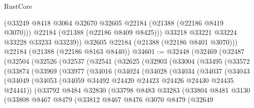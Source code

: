 \begin{lexlean}{RustCore}
\begin{coremodule}
            (@33249 @8418 @3064 @32670 @32605 @22184 (@21388 (@22186 @8419 @3070)))
            @22184
            (@21388 (@22186 @8409 @8425)))
          @33218
          @33221
          @33224
          @33228
          @33233
          @33239))
      @32605
      @22184
      (@21388 (@22186 @8401 @3070)))
    @22184
    (@21388 (@22186 @8163 @8440))
@34601 := @32448
    (@32469
      (@32487
        (@32504
          (@32526
            (@32537
              (@32541
                (@32625
                  (@32903
                    (@33004
                      (@33495
                        (@33572
                          (@33874
                            (@33969
                              (@33977
                                (@34016
                                  (@34024
                                    (@34028
                                      (@34034
                                        (@34037
                                          (@34043
                                            (@34049
                                              (@34053
                                                (@34059
                                                  @34492
                                                  @24420
                                                  @24423
                                                  @24426
                                                  @24430
                                                  @24435
                                                  @24441))
                                              (@33792
                                                @8484
                                                @32830
                                                (@33798
                                                  @8483
                                                  @33283
                                                  (@33804
                                                    @8481
                                                    @3130
                                                    (@33808
                                                      @8467
                                                      @8479
                                                      (@33812
                                                        @8467
                                                        @8476
                                                        @3070
                                                        @8479
                                                        (@32649

\end{coremodule}
\end{lexlean}
